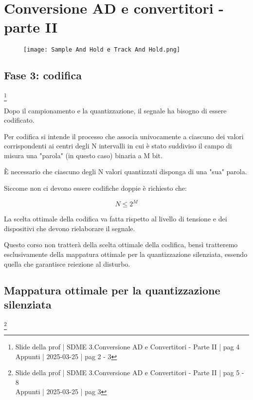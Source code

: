 \chapter{Conversione AD e convertitori - parte II}

\begin{figure}[h]
    \centering
    \texttt{[image: Sample And Hold e Track And Hold.png]}
\end{figure}

\newpage 

\section{Fase 3: codifica}
\footnote{Slide della prof | SDME 3.Conversione AD e Convertitori - Parte II | pag 4 \\  
Appunti | 2025-03-25 | pag 2 - 3}

Dopo il campionamento e la quantizzazione, 
il segnale ha bisogno di essere codificato. \newline 

Per codifica si intende il processo che associa univocamente a ciascuno dei valori 
corrispondenti ai centri degli N intervalli in cui è stato suddiviso il campo di misura 
una "parola" (in questo caso) binaria a M bit. \newline 

È necessario che ciascuno degli N valori quantizzati disponga di una "sua" parola. \newline 

Siccome non ci devono essere codifiche doppie è richiesto che: 

{
    \Large 
    \begin{equation}
        N \le 2^{M}
    \end{equation}
}

La scelta ottimale della codifica va fatta rispetto al livello di tensione e dei dispositivi che devono rielaborare il segnale. \newline 

Questo corso non tratterà della scelta ottimale della codifica, 
bensì tratteremo esclusivamente della mappatura ottimale per la quantizzazione silenziata, 
essendo quella che garantisce reiezione al disturbo. \newline 

\newpage 

\section{Mappatura ottimale per la quantizzazione silenziata}
\footnote{Slide della prof | SDME 3.Conversione AD e Convertitori - Parte II | pag 5 - 8 \\  
Appunti | 2025-03-25 | pag 3}

